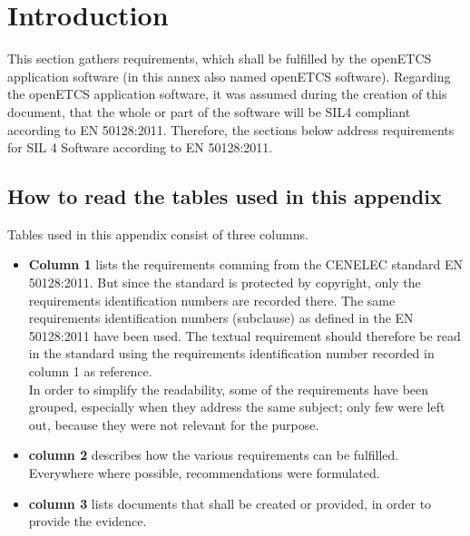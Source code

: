 \documentclass{template/openetcs_report}
\begin{document}
\section{Introduction}
This section gathers requirements, which shall be fulfilled by the openETCS application software (in this annex also named openETCS software).
Regarding the openETCS application software, it was assumed during the creation of this document, that the whole or part of the software will be SIL4 compliant according to EN 50128:2011. Therefore, the sections below address requirements for SIL 4 Software according to EN 50128:2011.

\subsection{How to read the tables used in this appendix}
Tables used in this appendix consist of three columns.
\begin{itemize}\itemsep=0pt
  \item \textbf{Column 1} lists the requirements comming from the CENELEC standard EN 50128:2011. But since the standard is protected by copyright, only the requirements identification numbers are recorded there. The same requirements identification numbers (subclause) as defined in the EN 50128:2011 have been used. The textual requirement should therefore be read in the standard using the requirements identification number recorded in column 1 as reference.\\
In order to simplify the readability, some of the requirements have been grouped, especially when they address the same subject; only few were left out, because they were not relevant for the purpose.
  \item \textbf{column 2} describes how the various requirements can be fulfilled. Everywhere where possible, recommendations were formulated.
  \item \textbf{column 3} lists documents that shall be created or provided, in order to provide the evidence.
\end{itemize}
\end{document}
